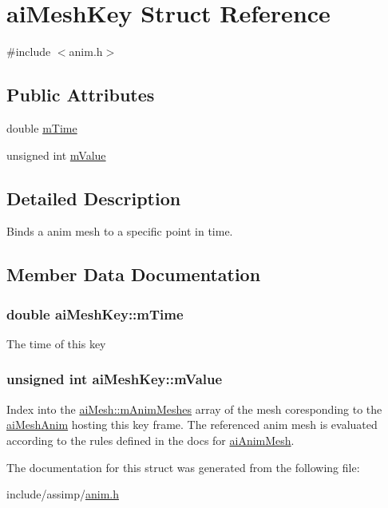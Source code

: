 \hypertarget{structaiMeshKey}{\section{ai\-Mesh\-Key \-Struct \-Reference}
\label{structaiMeshKey}
}


{\ttfamily \#include $<$anim.\-h$>$}

\subsection*{\-Public \-Attributes}
\begin{DoxyCompactItemize}
\item 
double \hyperlink{structaiMeshKey_a0814e4b14ed162295ba19331410a51ab}{m\-Time}
\item 
unsigned int \hyperlink{structaiMeshKey_abdd5914697609a9d876f63b6ca090a18}{m\-Value}
\end{DoxyCompactItemize}


\subsection{\-Detailed \-Description}
\-Binds a anim mesh to a specific point in time. 

\subsection{\-Member \-Data \-Documentation}
\hypertarget{structaiMeshKey_a0814e4b14ed162295ba19331410a51ab}{
\subsubsection[{m\-Time}]{\setlength{\rightskip}{0pt plus 5cm}double {\bf ai\-Mesh\-Key\-::m\-Time}}}\label{structaiMeshKey_a0814e4b14ed162295ba19331410a51ab}
\-The time of this key \hypertarget{structaiMeshKey_abdd5914697609a9d876f63b6ca090a18}{
\subsubsection[{m\-Value}]{\setlength{\rightskip}{0pt plus 5cm}unsigned int {\bf ai\-Mesh\-Key\-::m\-Value}}}\label{structaiMeshKey_abdd5914697609a9d876f63b6ca090a18}
\-Index into the \hyperlink{structaiMesh_a5078f7db7e99ed05db89dfa412f0e990}{ai\-Mesh\-::m\-Anim\-Meshes} array of the mesh coresponding to the \hyperlink{structaiMeshAnim}{ai\-Mesh\-Anim} hosting this key frame. \-The referenced anim mesh is evaluated according to the rules defined in the docs for \hyperlink{structaiAnimMesh}{ai\-Anim\-Mesh}. 

\-The documentation for this struct was generated from the following file\-:\begin{DoxyCompactItemize}
\item 
include/assimp/\hyperlink{anim_8h}{anim.\-h}\end{DoxyCompactItemize}
